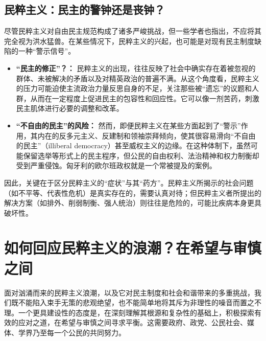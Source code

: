 \documentclass[UTF8, 10pt]{ctexbook}
\begin{document}
\subsection{民粹主义：民主的警钟还是丧钟？}
尽管民粹主义对自由民主规范构成了诸多严峻挑战，但一些学者也指出，不应将其完全视为洪水猛兽。在某些情况下，民粹主义的兴起，也可能是对现有民主制度缺陷的一种“警示信号”。
\begin{itemize}
    \item \textbf{“民主的修正”？：} 民粹主义的出现，往往反映了社会中确实存在着被忽视的群体、未被解决的矛盾以及对精英政治的普遍不满。从这个角度看，民粹主义的压力可能迫使主流政治力量反思自身的不足，关注那些被“遗忘”的议题和人群，从而在一定程度上促进民主的包容性和回应性。它可以像一剂苦药，刺激民主肌体进行必要的调整和改革。
    \item \textbf{“不自由的民主”的风险：} 然而，即便民粹主义在某些方面起到了“警示”作用，其内在的反多元主义、反建制和领袖崇拜倾向，使其很容易滑向“不自由的民主”（illiberal democracy）甚至威权主义的边缘。在这种体制下，虽然可能保留选举等形式上的民主程序，但公民的自由权利、法治精神和权力制衡却受到严重侵蚀。匈牙利的欧尔班政权就是一个常被提及的案例。
\end{itemize}
因此，关键在于区分民粹主义的“症状”与其“药方”。民粹主义所揭示的社会问题（如不平等、代表性危机）是真实存在的，需要认真对待；但民粹主义者所提出的解决方案（如排外、削弱制衡、强人统治）则往往是危险的，可能比疾病本身更具破坏性。

\section{如何回应民粹主义的浪潮？在希望与审慎之间}
\lettrine[lines=2]{面}{对}汹涌而来的民粹主义浪潮，以及它对民主制度和社会和谐带来的多重挑战，我们既不能陷入束手无策的悲观绝望，也不能简单地将其斥为非理性的噪音而置之不理。一个更具建设性的态度是，在深刻理解其根源和复杂性的基础上，积极探索有效的应对之道，在希望与审慎之间寻求平衡。这需要政府、政党、公民社会、媒体、学界乃至每一个公民的共同努力。
\end{document}
